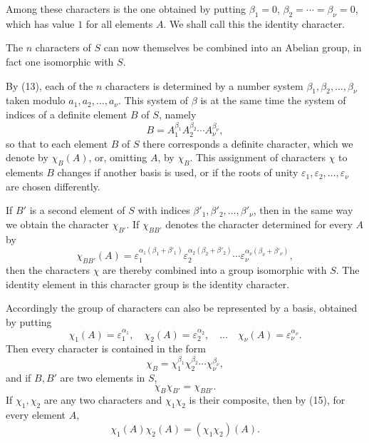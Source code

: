 \documentclass[11pt]{article}
\begin{document}
Among these characters is the one obtained by putting $\beta_1=0$, $\beta_2=\cdots=\beta_\nu=0$, which has value $1$ for all elements $A$. We shall call this the identity character.

The $n$ characters of $S$ can now themselves be combined into an Abelian group, in fact one isomorphic with $S$.

By (13), each of the $n$ characters is determined by a number system $\beta_1,\beta_2,
\ldots,
\beta_\nu$ taken modulo $a_1,a_2,
\ldots,a_\nu$. This system of $\beta$ is at the same time the system of indices of a definite element $B$ of $S$, namely
\begin{equation}
B=A_1^{\beta_1}A_2^{\beta_2}\cdots A_\nu^{\beta_\nu},
\tag{14}
\end{equation}
so that to each element $B$ of $S$ there corresponds a definite character, which we denote by $\chi_B(A)$, or, omitting $A$, by $\chi_B$. This assignment of characters $\chi$ to elements $B$ changes if another basis is used, or if the roots of unity $\varepsilon_1,\varepsilon_2,
\ldots,
\varepsilon_\nu$ are chosen differently.

If $B'$ is a second element of $S$ with indices $\beta'_1,
\beta'_2,
\ldots,
\beta'_\nu$, then in the same way we obtain the character $\chi_{B'}$. If $\chi_{BB'}$ denotes the character determined for every $A$ by
\begin{equation}
\chi_{BB'}(A)=
\varepsilon_1^{\alpha_1(\beta_1+\beta'_1)}
\varepsilon_2^{\alpha_2(\beta_2+\beta'_2)}
\cdots
\varepsilon_\nu^{\alpha_\nu(\beta_\nu+\beta'_\nu)},
\tag{15}
\end{equation}
then the characters $\chi$ are thereby combined into a group isomorphic with $S$. The identity element in this character group is the identity character.

Accordingly the group of characters can also be represented by a basis, obtained by putting
\begin{equation}
\chi_1(A)=\varepsilon_1^{\alpha_1},
\quad \chi_2(A)=\varepsilon_2^{\alpha_2},
\quad\ldots\quad
\chi_\nu(A)=\varepsilon_\nu^{\alpha_\nu}.
\tag{16}
\end{equation}
Then every character is contained in the form
\begin{equation}
\chi_B=\chi_1^{\beta_1}\chi_2^{\beta_2}\cdots\chi_\nu^{\beta_\nu},
\tag{17}
\end{equation}
and if $B,B'$ are two elements in $S$,
\begin{equation}
\chi_B\chi_{B'}=\chi_{BB'}.
\tag{18}
\end{equation}
If $\chi_1,\chi_2$ are any two characters and $\chi_1\chi_2$ is their composite, then by (15), for every element $A$,
\begin{equation}
\chi_1(A)\chi_2(A)=(\chi_1\chi_2)(A).
\tag{19}
\end{equation}
\end{document}
